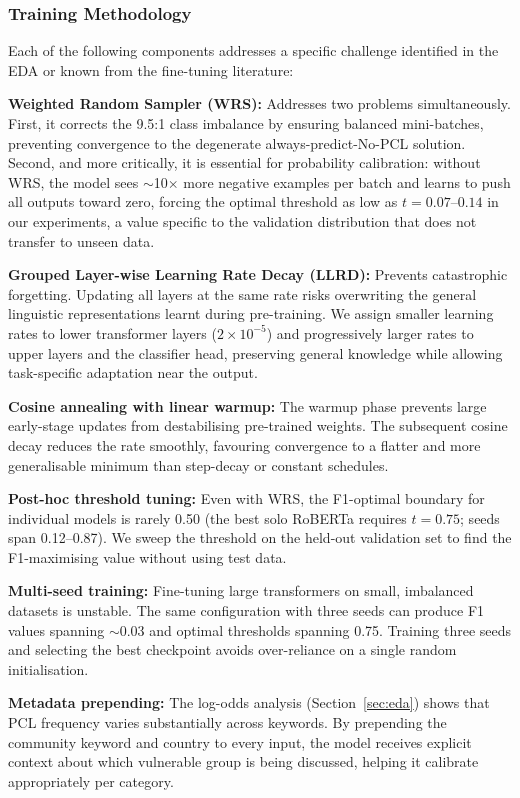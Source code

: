 \documentclass[11pt]{article}
\begin{document}
\subsubsection*{Training Methodology}

Each of the following components addresses a specific challenge identified in the EDA or known from the fine-tuning literature:

\textbf{Weighted Random Sampler (WRS):} Addresses two problems simultaneously. First, it corrects the 9.5:1 class imbalance by ensuring balanced mini-batches, preventing convergence to the degenerate always-predict-No-PCL solution. Second, and more critically, it is essential for probability calibration: without WRS, the model sees $\sim$10$\times$ more negative examples per batch and learns to push all outputs toward zero, forcing the optimal threshold as low as $t=0.07$--$0.14$ in our experiments, a value specific to the validation distribution that does not transfer to unseen data.

\textbf{Grouped Layer-wise Learning Rate Decay (LLRD):} Prevents catastrophic forgetting. Updating all layers at the same rate risks overwriting the general linguistic representations learnt during pre-training. We assign smaller learning rates to lower transformer layers ($2 \times 10^{-5}$) and progressively larger rates to upper layers and the classifier head, preserving general knowledge while allowing task-specific adaptation near the output.

\textbf{Cosine annealing with linear warmup:} The warmup phase prevents large early-stage updates from destabilising pre-trained weights. The subsequent cosine decay reduces the rate smoothly, favouring convergence to a flatter and more generalisable minimum than step-decay or constant schedules.

\textbf{Post-hoc threshold tuning:} Even with WRS, the F1-optimal boundary for individual models is rarely 0.50 (the best solo RoBERTa requires $t=0.75$; seeds span 0.12--0.87). We sweep the threshold on the held-out validation set to find the F1-maximising value without using test data.

\textbf{Multi-seed training:} Fine-tuning large transformers on small, imbalanced datasets is unstable. The same configuration with three seeds can produce F1 values spanning $\sim$0.03 and optimal thresholds spanning 0.75. Training three seeds and selecting the best checkpoint avoids over-reliance on a single random initialisation.

\textbf{Metadata prepending:} The log-odds analysis (Section~\ref{sec:eda}) shows that PCL frequency varies substantially across keywords. By prepending the community keyword and country to every input, the model receives explicit context about which vulnerable group is being discussed, helping it calibrate appropriately per category.
\end{document}
